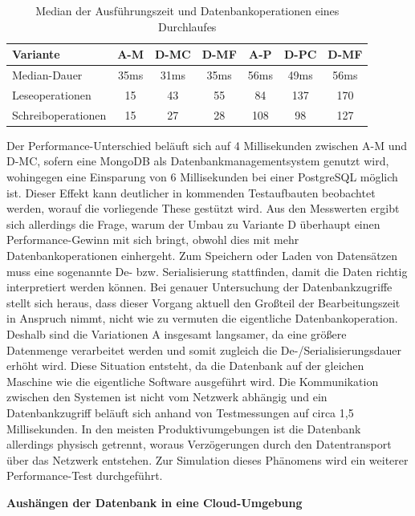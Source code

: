 \begin{table}[htpb]
	\centering
	\begin{tabular}{ | >{\raggedright\arraybackslash}m{} || c | c | c | c | c | c | } 
		\hline
		Variante & A-M & D-MC & D-MF & A-P & D-PC & D-MF \\ 
		\hline
		Median-Dauer & 35ms & 31ms & 35ms & 56ms & 49ms & 56ms \\
		\hline
		Leseoperationen & 15 & 43 &  55 &  84 & 137 & 170 \\
		\hline
		Schreiboperationen & 15 & 27 & 28 & 108 & 98 & 127 \\
		\hline
	\end{tabular}
	\caption{Median der Ausführungszeit und Datenbankoperationen eines Durchlaufes}
	\label{fig:durationofexecution}
\end{table}

Der Performance-Unterschied beläuft sich auf 4 Millisekunden zwischen A-M und D-MC, sofern eine MongoDB als Datenbankmanagementsystem genutzt wird, wohingegen eine Einsparung von 6 Millisekunden bei einer PostgreSQL möglich ist. Dieser Effekt kann deutlicher in kommenden Testaufbauten beobachtet werden, worauf die vorliegende These gestützt wird. Aus den Messwerten ergibt sich allerdings die Frage, warum der Umbau zu Variante D überhaupt einen Performance-Gewinn mit sich bringt, obwohl dies mit mehr Datenbankoperationen einhergeht. Zum Speichern oder Laden von Datensätzen muss eine sogenannte De- bzw. \Gls{Serialisierung} stattfinden, damit die Daten richtig interpretiert werden können. Bei genauer Untersuchung der Datenbankzugriffe stellt sich heraus, dass dieser Vorgang aktuell den Großteil der Bearbeitungszeit in Anspruch nimmt, nicht wie zu vermuten die eigentliche Datenbankoperation. Deshalb sind die Variationen A insgesamt langsamer, da eine größere Datenmenge verarbeitet werden und somit zugleich die De-/Serialisierungsdauer erhöht wird. Diese Situation entsteht, da die Datenbank auf der gleichen Maschine wie die eigentliche Software ausgeführt wird. Die Kommunikation zwischen den Systemen ist nicht vom Netzwerk abhängig und ein Datenbankzugriff beläuft sich anhand von Testmessungen auf circa 1,5 Millisekunden. In den meisten Produktivumgebungen ist die Datenbank allerdings physisch getrennt, woraus Verzögerungen durch den Datentransport über das Netzwerk entstehen. Zur Simulation dieses Phänomens wird ein weiterer Performance-Test durchgeführt. 

\textbf{Aushängen der Datenbank in eine Cloud-Umgebung}

